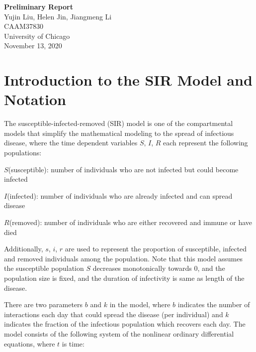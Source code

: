 \documentclass{article}
\begin{document}
\begin{titlepage}
  \begin{center}

    \huge
    \textbf{Preliminary Report}\\
    \vspace{4.5cm}
    \LARGE
    Yujin Liu, Helen Jin, Jiangmeng Li\\
    \vspace{4.5cm}
    \Large
    CAAM37830\\
    \vspace{1cm}
    University of Chicago\\
    \vspace{1cm}
    November 13, 2020

  \end{center}

\end{titlepage}







\section{Introduction to the SIR Model and Notation}

The susceptible-infected-removed (SIR) model is one of the compartmental models that simplify the mathematical modeling to the spread of infectious disease, where the time dependent variables $S$, $I$, $R$ each represent the following populations:

$S$(susceptible): number of individuals who are not infected but could become infected

$I$(infected): number of individuals who are already infected and can spread disease

$R$(removed): number of individuals who are either recovered and immune or have died

Additionally, $s$, $i$, $r$ are used to represent the proportion of susceptible, infected and removed individuals among the population. Note that this model assumes the susceptible population $S$ decreases monotonically towards 0, and the population size is fixed, and the duration of infectivity is same as length of the disease.

There are two parameters $b$ and $k$ in the model, where $b$ indicates the number of interactions each day that could spread the disease (per individual) and $k$ indicates the fraction of the infectious population which recovers each day. The model consists of the following system of the nonlinear ordinary differential equations, where $t$ is time:
\end{document}
